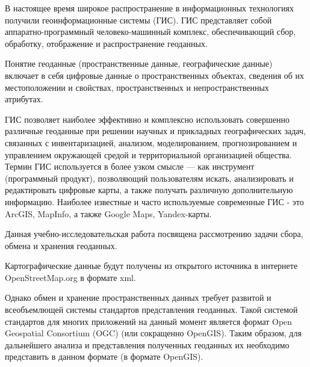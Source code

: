 \documentclass[12pt,a4paper,oneside]{article} %
\begin{document}
\large{

В настоящее время широкое распространение в информационных \linebreak %
технологиях получили геоинформационные системы (ГИС). ГИС  \linebreak %
представляет собой аппаратно-программный человеко-машинный \linebreak %
комплекс, обеспечивающий сбор, обработку, отображение и \linebreak
распространение геоданных.

Понятие геоданные (пространственные данные, географические \linebreak
данные) включает в себя цифровые данные о пространственных \linebreak
объектах, сведения об их местоположении и свойствах, пространственных \linebreak
и непространственных атрибутах.

ГИС позволяет наиболее эффективно и комплексно  использовать \linebreak
совершенно различные геоданные при решении научных и прикладных \linebreak
географических задач, связанных с инвентаризацией, анализом, \linebreak
моделированием, прогнозированием и управлением окружающей средой и \linebreak
территориальной организацией общества. Термин ГИС используется \linebreak
в более узком смысле — как инструмент (программный продукт), \linebreak
позволяющий пользователям искать, анализировать и редактировать \linebreak
цифровые карты, а также получать различную дополнительную \linebreak
информацию. Наиболее известные и часто используемые современные \linebreak
ГИС - это ArcGIS, MapInfo, а также Google Maps, Yandex-карты.

Данная учебно-исследовательская работа посвящена рассмотрению \linebreak
задачи сбора, обмена и хранения геоданных.

Картографические данные будут получены из открытого источника \linebreak
в интернете OpenStreetMap.org в формате xml.

Однако обмен и хранение пространственных данных требует \linebreak
развитой и всеобъемлющей системы стандартов представления \linebreak
геоданных. Такой системой стандартов для многих приложений \linebreak
на данный момент является формат Open Geospatial \linebreak
Consortium (OGC) (или сокращенно OpenGIS). Таким образом,  \linebreak
для дальнейшего анализа и представления полученных \linebreak
геоданных их необходимо представить в данном формате \linebreak
(в формате OpenGIS).

}
\end{document}
